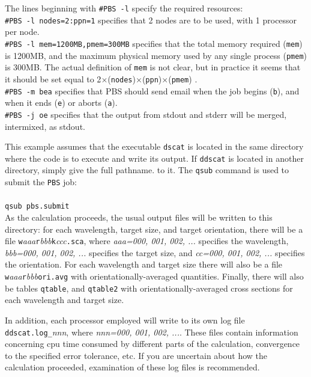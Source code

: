 \noindent
The lines beginning with {\tt\#PBS -l} specify the required resources:\\
{\tt\#PBS -l nodes=2:ppn=1} specifies that 2 nodes are to be used,
with 1 processor per node.\\
{\tt\#PBS -l mem=1200MB,pmem=300MB} specifies that the total memory
required ({\tt mem}) is 1200MB, 
and the maximum physical memory used by any single
process ({\tt pmem}) is 300MB.  The actual definition of {\tt mem} is
not clear, but in practice it seems that it should be set equal to
2$\times$({\tt nodes})$\times$({\tt ppn})$\times$({\tt pmem}) .\\
{\tt\#PBS -m bea} specifies that PBS should send email when the job begins
({\tt b}), and when it ends ({\tt e}) or aborts ({\tt a}).\\
{\tt\#PBS -j oe} specifies that the output from stdout and stderr will be
merged, intermixed, as stdout.

\noindent This example assumes that the executable {\tt dscat} is located
in the same directory where the code is to execute and write its output.
If {\tt ddscat} is located in another directory, simply give the full pathname.
to it.
The {\tt qsub} command is used to submit the {\tt PBS} job:\\
\\
 {\tt qsub pbs.submit}\\

As the calculation proceeds, the usual 
output files will be written to this directory: for each wavelength, 
target size, and target orientation,
there will be a file
{\tt w}{\it aaa}{\tt r}{\it bbb}{\tt k}{\it ccc}{\tt .sca}, where
{\it aaa=000, 001, 002, ...} specifies the wavelength,
{\it bbb=000, 001, 002, ...} specifies the target size,
and
{\it cc=000, 001, 002, ...} specifies the orientation.
For each wavelength and target size there will also be a file
{\tt w}{\it aaa}{\tt r}{\it bbb}{\tt ori.avg} with orientationally-averaged
quantities.
Finally, there will also be tables {\tt qtable},
and {\tt qtable2} with orientationally-averaged cross sections for each
wavelength and target size.

In addition, each processor employed will write to its own log file
{\tt ddscat.log\_}{\it nnn}, where {\it nnn=000, 001, 002, ...}.
These files contain information
concerning cpu time consumed by different parts of the calculation,
convergence to the specified error tolerance, etc.  If you are uncertain
about how the calculation proceeded, examination of these log files
is recommended.

